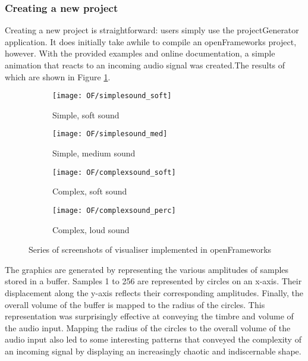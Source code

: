 \documentclass[../../initial_thesis.tex]{subfiles}
\begin{document}
\subsubsection{Creating a new project}
Creating a new project is straightforward: users simply use the projectGenerator application. It does initially take awhile to compile an openFrameworks project, however. With the provided examples and online documentation, a simple animation that reacts to an incoming audio signal was created.\footnotemark The results of which are shown in Figure \ref{fig:OFVisualiser}.

\begin{figure}
  \begin{subfigure}{0.5\textwidth}
    \centering
    \texttt{[image: OF/simplesound\_soft]}
    \caption{Simple, soft sound}
  \end{subfigure} 
  \begin{subfigure}{0.5\textwidth}
    \centering
    \texttt{[image: OF/simplesound\_med]}
    \caption{Simple, medium sound}
  \end{subfigure}
  \begin{subfigure}{0.5\textwidth}
    \centering
    \texttt{[image: OF/complexsound\_soft]}
    \caption{Complex, soft sound}
  \end{subfigure}
  \begin{subfigure}{0.5\textwidth}
    \centering
    \texttt{[image: OF/complexsound\_perc]}
    \caption{Complex, loud sound}
  \end{subfigure}
  \caption{Series of screenshots of visualiser implemented in openFrameworks}
  \label{fig:OFVisualiser}
\end{figure}

The graphics are generated by representing the various amplitudes of samples stored in a buffer. Samples 1 to 256 are represented by circles on an x-axis. Their displacement along the y-axis reflects their corresponding amplitudes. Finally, the overall volume of the buffer is mapped to the radius of the circles. This representation was surprisingly effective at conveying the timbre and volume of the audio input. Mapping the radius of the circles to the overall volume of the audio input also led to some interesting patterns that conveyed the complexity of an incoming signal by displaying an increasingly chaotic and indiscernable shape.
\end{document}
